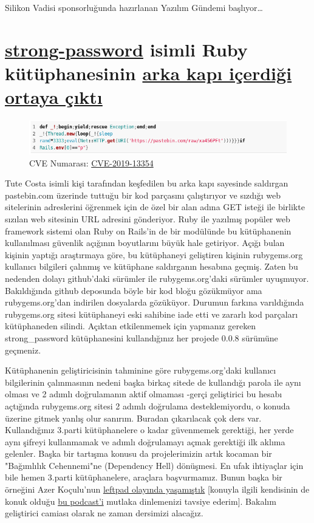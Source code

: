 \documentclass[11pt]{article}
\begin{document}
Silikon Vadisi sponsorluğunda hazırlanan Yazılım Gündemi başlıyor\ldots{}
\newpage
\section{\href{https://rubygems.org/gems/strong\_password/}{strong-password} isimli Ruby kütüphanesinin \href{https://withatwist.dev/strong-password-rubygem-hijacked.html}{arka kapı içerdiği ortaya çıktı}}
\label{sec:org10e59cb}
\begin{figure}[htbp]
\centering
\includegraphics[width=.9\linewidth]{gorseller/strongpassword-ruby.png}
\caption{CVE Numarası: \href{https://nvd.nist.gov/vuln/detail/CVE-2019-13354}{CVE-2019-13354}}
\end{figure}

Tute Costa isimli kişi tarafından keşfedilen bu arka kapı sayesinde saldırgan
pastebin.com üzerinde tuttuğu bir kod parçasını çalıştırıyor ve sızdığı web
sitelerinin adreslerini öğrenmek için de özel bir alan adına GET isteği ile
birlikte sızılan web sitesinin URL adresini gönderiyor. Ruby ile yazılmış
popüler web framework sistemi olan Ruby on Rails'in de bir modülünde bu
kütüphanenin kullanılması güvenlik açığının boyutlarını büyük hale getiriyor.
Açığı bulan kişinin yaptığı araştırmaya göre, bu kütüphaneyi geliştiren kişinin
rubygems.org kullanıcı bilgileri çalınmış ve kütüphane saldırganın hesabına
geçmiş. Zaten bu nedenden dolayı github'daki sürümler ile rubygems.org'daki
sürümler uyuşmuyor. Bakıldığında github deposunda böyle bir kod bloğu
gözükmüyor ama rubygems.org'dan indirilen dosyalarda gözüküyor. Durumun farkına
varıldığında rubygems.org sitesi kütüphaneyi eski sahibine iade etti ve zararlı
kod parçaları kütüphaneden silindi. Açıktan etkilenmemek için yapmanız gereken
strong\_password kütüphanesini kullandığınız her projede 0.0.8 sürümüne
geçmeniz.

Kütüphanenin geliştiricisinin tahminine göre rubygems.org'daki kullanıcı
bilgilerinin çalınmasının nedeni başka birkaç sitede de kullandığı parola ile
aynı olması ve 2 adımlı doğrulamanın aktif olmaması -gerçi geliştirici bu
hesabı açtığında rubygems.org sitesi 2 adımlı doğrulama desteklemiyordu, o
konuda üzerine gitmek yanlış olur sanırım. Buradan çıkarılacak çok ders var.
Kullandığınız 3.parti kütüphanelere o kadar güvenmemek gerektiği, her yerde
aynı şifreyi kullanmamak ve adımlı doğrulamayı açmak gerektiği ilk aklıma
gelenler. Başka bir tartışma konusu da projelerimizin artık kocaman bir
"Bağımlılık Cehennemi"ne (Dependency Hell) dönüşmesi. En ufak ihtiyaçlar için
bile hemen 3.parti kütüphanelere, araçlara başvurmamız. Bunun başka bir
örneğini Azer Koçulu'nun \href{https://medium.com/eserozvataf/azer-ko\%25C3\%25A7ulu-kik-left-pad-ve-npm-ed7c3098ecfb}{leftpad olayında yaşamıştık} [konuyla ilgili kendisinin
de konuk olduğu \href{https://devpod.org/2016/03/28/036/}{bu podcast'i} mutlaka dinlemenizi tavsiye ederim]. Bakalım
geliştirici camiası olarak ne zaman dersimizi alacağız.
\end{document}
